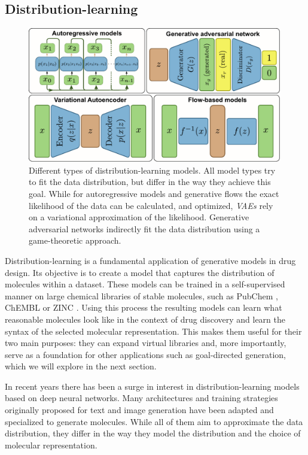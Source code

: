 \subsection{Distribution-learning}
\begin{figure}
    \centering
    \includegraphics[width=0.99\textwidth]{figures/distribution-learning-models.pdf}
    \caption{Different types of distribution-learning models. All model types
        try to fit the data distribution, but differ in the way they achieve this goal.
        While for autoregressive models and generative flows the exact likelihood of the data can be calculated,
        and optimized, \emph{VAEs} rely on a variational approximation of the likelihood. Generative adversarial networks
        indirectly fit the data distribution using a game-theoretic approach. \label{fig:distribution-learning-models}}
\end{figure}
Distribution-learning is a fundamental application of generative models in drug design. Its
objective is to create a model that captures the distribution of molecules within a dataset. These
models can be trained in a self-supervised manner on large chemical libraries of stable molecules,
such as PubChem \citep{kimPubChemSubstanceCompound2016}, ChEMBL
\citep{bentoChEMBLBioactivityDatabase2014} or ZINC \citep{irwinZINCFreeTool2012}. Using this process
the resulting models can learn what reasonable molecules look like in the context of drug discovery
and learn the syntax of the selected molecular representation. This makes them useful for their two
main purposes: they can expand virtual libraries and, more importantly, serve as a foundation for other
applications such as goal-directed generation, which we will explore in the next section.

In recent years there has been a surge in interest in distribution-learning models based on deep neural
networks. Many architectures and training strategies originally proposed for text and image
generation have been adapted and specialized to generate molecules. While all of them aim to
approximate the data distribution, they differ in the way they model the distribution and the choice
of molecular representation.

